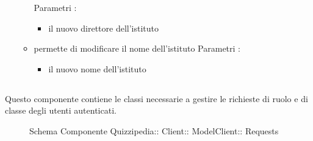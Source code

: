 \begin{itemize}
\begin{itemize}
\newline
Parametri :
\begin{itemize}
\item {}
\newline
il nuovo direttore dell'istituto
\end{itemize}
\item {}
\newline
permette di modificare il nome dell'istituto
\newline
Parametri :
\begin{itemize}
\item {}
\newline
il nuovo nome dell'istituto
\end{itemize}
\end{itemize}
\end{itemize}
\subsection{}
Questo componente contiene le classi necessarie a gestire le richieste di ruolo e di classe degli utenti autenticati.
\begin{figure}[H]
\centering
\noindent{}
\caption[Schema Componente Requests]{Schema Componente Quizzipedia:: Client:: ModelClient:: Requests}
\end{figure}

